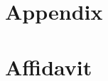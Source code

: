 \documentclass[12pt,a4paper]{article}
\begin{document}
\newpage
\appendix
\section{Appendix}

\newpage

\section{Affidavit}

\end{document}

